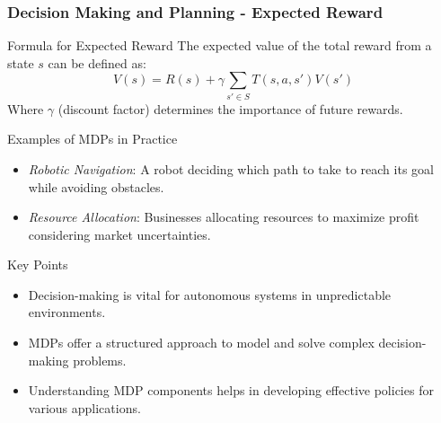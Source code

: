 \documentclass[aspectratio=169]{beamer}
\begin{document}
\begin{frame}[fragile]
    \frametitle{Decision Making and Planning - Expected Reward}
    \begin{block}{Formula for Expected Reward}
        The expected value of the total reward from a state \( s \) can be defined as:
        \begin{equation}
            V(s) = R(s) + \gamma \sum_{s' \in S} T(s, a, s')V(s')
        \end{equation}
        Where \( \gamma \) (discount factor) determines the importance of future rewards.
    \end{block}
    
    \begin{block}{Examples of MDPs in Practice}
        \begin{itemize}
            \item \textit{Robotic Navigation}: A robot deciding which path to take to reach its goal while avoiding obstacles.
            \item \textit{Resource Allocation}: Businesses allocating resources to maximize profit considering market uncertainties.
        \end{itemize}
    \end{block}

    \begin{block}{Key Points}
        \begin{itemize}
            \item Decision-making is vital for autonomous systems in unpredictable environments.
            \item MDPs offer a structured approach to model and solve complex decision-making problems.
            \item Understanding MDP components helps in developing effective policies for various applications.
        \end{itemize}
    \end{block}
\end{frame}
\end{document}
